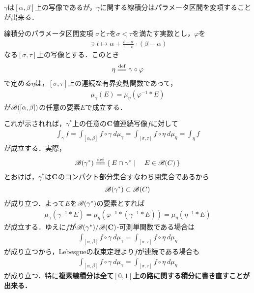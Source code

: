 	$\gamma$は$[\alpha,\beta]$上の写像であるが，$\gamma$に関する線積分はパラメータ区間を変項することが出来る．
	
	\begin{itembox}[l]{線積分のパラメータ区間変項}
		$\sigma$と$\tau$を$\sigma < \tau$を満たす実数とし，$\varphi$を
		\begin{align}
			[\sigma,\tau] \ni t \longmapsto \alpha + \frac{t - \sigma}{\tau - \sigma} \cdot (\beta - \alpha)
		\end{align}
		なる$[\sigma,\tau]$上の写像とする．このとき
		\begin{align}
			\eta \defeq \gamma \circ \varphi
		\end{align}
		で定める$\eta$は，$[\sigma,\tau]$上の連続な有界変動関数であって，
		\begin{align}
			\mu_{\gamma}(E) = \mu_{\eta} \left(\varphi^{-1} \ast E\right)
		\end{align}
		が$\mathscr{B}([\alpha,\beta])$の任意の要素$E$で成立する．
	\end{itembox}
	
	これが示されれば，$\gamma^*$上の任意の$\mathbf{C}$値連続写像$f$に対して
	\begin{align}
		\int_{\gamma} f = \int_{[\alpha,\beta]} f \circ \gamma\ d\mu_{\gamma}
		= \int_{[\sigma,\tau]} f \circ \eta\ d\mu_{\eta} = \int_{\eta} f
		\label{fom:change_of_parameter_interval_complex_contour_integral}
	\end{align}
	が成立する．実際，
	\begin{align}
		\borel{\gamma^*} \defeq \Set{E \cap \gamma^*}{E \in \borel{C}}
	\end{align}
	とおけば，$\gamma^*$は$\mathbf{C}$のコンパクト部分集合すなわち閉集合であるから
	\begin{align}
		\mathscr{B}(\gamma^*) \subset \mathscr{B}(C)
	\end{align}
	が成り立つ．よって$E$を$\mathscr{B}(\gamma^*)$の要素とすれば
	\begin{align}
		\mu_{\gamma}\left(\gamma^{-1} \ast E\right)
		= \mu_{\eta}\left(\varphi^{-1} \ast (\gamma^{-1} \ast E)\right)
		= \mu_{\eta}\left(\eta^{-1} \ast E\right)
	\end{align}
	が成立する．ゆえに$f$が$\mathscr{B}(\gamma^*)/\mathscr{B}(\mathbf{C})$-可測単関数である場合は
	\begin{align}
		\int_{[\alpha,\beta]} f \circ \gamma\ d\mu_{\gamma} = \int_{[\sigma,\tau]} f \circ \eta\ d\mu_{\eta}
	\end{align}
	が成り立つから，Lebesgueの収束定理より$f$が連続である場合も
	\begin{align}
		\int_{[\alpha,\beta]} f \circ \gamma\ d\mu_{\gamma} = \int_{[\sigma,\tau]} f \circ \eta\ d\mu_{\eta}
	\end{align}
	が成り立つ．特に{\bf 複素線積分は全て$[0,1]$上の路に関する積分に書き直すことが出来る．}
	
